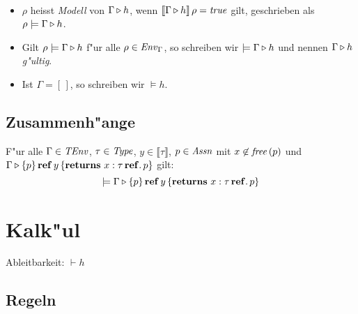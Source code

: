 \documentclass[12pt,a4paper,bigheadings]{scrartcl}
\newcommand{\semantic}[1]{\ensuremath{\llbracket#1\rrbracket}}
\newcommand{\TEnv}{\name{TEnv}}
\newcommand{\Assn}{\name{Assn}}
\begin{document}
\begin{definition}[Modell] \
  \begin{itemize}
    \item $\rho$ heisst {\em Modell} von $\Gamma \triangleright h$, wenn $\semantic{\Tjh{\Gamma}{h}}\,\rho = \true$
          gilt, geschrieben als $\rho \models \Gamma \triangleright h$.
    \item Gilt $\rho \models \Gamma \triangleright h$ f"ur alle $\rho\in{\text{\it Env\/}}_\Gamma$, so schreiben wir
          $\models \Gamma \triangleright h$ und nennen  $\Gamma \triangleright h$ {\em g"ultig}.
    \item Ist $\Gamma = [\,]$, so schreiben wir $\models h$.
  \end{itemize}
\end{definition}


\subsection{Zusammenh"ange}

\begin{lemma}
  F"ur alle $\Gamma\in\TEnv$, $\tau\in{\text{\it Type\/}}$, $y\in\semantic{\tau}$, $p \in\Assn$ mit
  $x \not \in {\text{\it free\/}}\,(p)$ und $\Gamma \triangleright \{p\}\,\mathbf{ref}\,y\,\{{\bf returns}\ x:\tau\,\mathbf{ref}.\, p\}$ gilt:
  \[
    \models \Gamma \triangleright \{p\}\,\mathbf{ref}\,y\,\{{\bf returns}\ x:\tau\,\mathbf{ref}.\, p\}
  \]
\end{lemma}



\section{Kalk"ul}

Ableitbarkeit: $\vdash h$

\subsection{Regeln}
\end{document}
